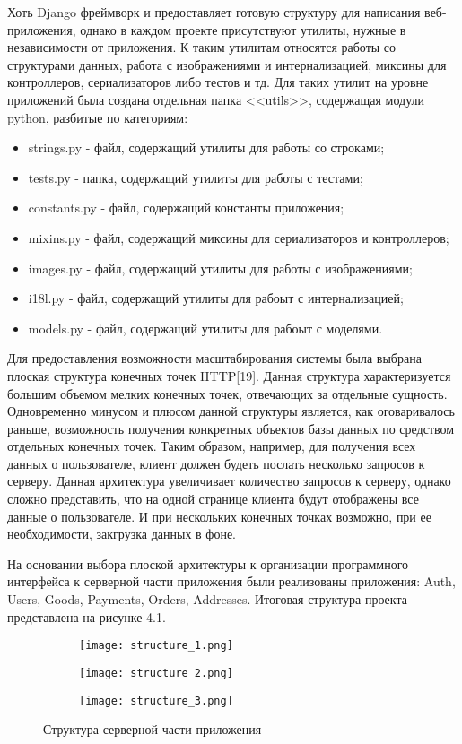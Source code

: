 Хоть Django фреймворк и предоставляет готовую структуру для написания веб-приложения, однако в каждом проекте присутствуют утилиты, нужные в независимости от приложения.
К таким утилитам относятся работы со структурами данных, работа с изображениями и интернализацией, миксины для контроллеров, сериализаторов либо тестов и тд.
Для таких утилит на уровне приложений была создана отдельная папка <<utils>>, содержащая модули python, разбитые по категориям:
\begin{itemize}
    \item strings.py - файл, содержащий утилиты для работы со строками;
    \item tests.py - папка, содержащий утилиты для работы с тестами;
    \item constants.py - файл, содержащий константы приложения;
    \item mixins.py - файл, содержащий миксины для сериализаторов и контроллеров;
    \item images.py - файл, содержащий утилиты для работы с изображениями;
    \item i18l.py - файл, содержащий утилиты для рабоыт с интернализацией;
    \item models.py - файл, содержащий утилиты для рабоыт с моделями.
\end{itemize}

Для предоставления возможности масштабирования системы была выбрана плоская структура конечных точек HTTP[19].
Данная структура характеризуется большим объемом мелких конечных точек, отвечающих за отдельные сущность.
Одновременно минусом и плюсом данной структуры является, как оговаривалось раньше, возможность получения конкретных объектов базы данных по средством отдельных конечных точек.
Таким образом, например, для получения всех данных о пользователе, клиент должен будеть послать несколько запросов к серверу.
Данная архитектура увеличивает количество запросов к серверу, однако сложно представить, что на одной странице клиента будут отображены все данные о пользователе.
И при нескольких конечных точках возможно, при ее необходимости, закгрузка данных в фоне.

На основании выбора плоской архитектуры к организации программного интерфейса к серверной части приложения были реализованы приложения: Auth, Users, Goods, Payments, Orders, Addresses.
Итоговая структура проекта представлена на рисунке 4.1.

\begin{figure}[h!]
    \begin{subfigure}[b]{0.3\textwidth}
    \centering
    \texttt{[image: structure\_1.png]}
    \caption{}
    \end{subfigure}
    \begin{subfigure}[b]{0.3\textwidth}
    \centering
    \texttt{[image: structure\_2.png]}
    \caption{}
    \end{subfigure}
    \begin{subfigure}[b]{0.3\textwidth}
    \centering
    \texttt{[image: structure\_3.png]}
    \caption{}
    \end{subfigure}
    \caption{ Структура серверной части приложения }
    \label{fig:fire_alarms}
\end{figure}


